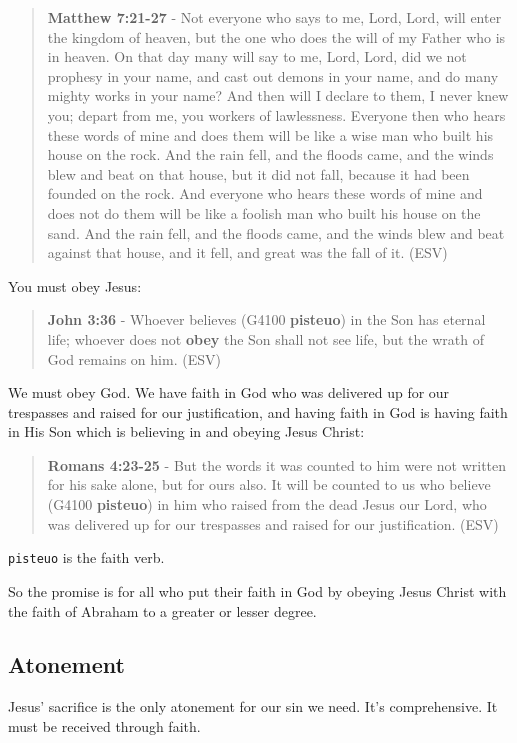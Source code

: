 \documentclass[11pt]{article}
\begin{document}
\begin{quote}
\textbf{Matthew 7:21-27} - Not everyone who says to me, Lord, Lord, will enter the kingdom of heaven, but the one who does the will of my Father who is in heaven.  On that day many will say to me, Lord, Lord, did we not prophesy in your name, and cast out demons in your name, and do many mighty works in your name?  And then will I declare to them, I never knew you; depart from me, you workers of lawlessness.  Everyone then who hears these words of mine and does them will be like a wise man who built his house on the rock.  And the rain fell, and the floods came, and the winds blew and beat on that house, but it did not fall, because it had been founded on the rock.  And everyone who hears these words of mine and does not do them will be like a foolish man who built his house on the sand.  And the rain fell, and the floods came, and the winds blew and beat against that house, and it fell, and great was the fall of it. (ESV)
\end{quote}

You must obey Jesus:

\begin{quote}
\textbf{John 3:36} - Whoever believes (G4100 \textbf{pisteuo}) in the Son has eternal life; whoever does not \textbf{obey} the Son shall not see life, but the wrath of God remains on him. (ESV)
\end{quote}

We must obey God. We have faith in God who was delivered up for our trespasses and raised for our justification, and having faith in God is having faith in His Son which is believing in and obeying Jesus Christ:

\begin{quote}
\textbf{Romans 4:23-25} - But the words it was counted to him were not written for his sake alone, but for ours also. It will be counted to us who believe (G4100 \textbf{pisteuo}) in him who raised from the dead Jesus our Lord, who was delivered up for our trespasses and raised for our justification. (ESV)
\end{quote}

\texttt{pisteuo} is the faith verb.

So the promise is for all who put their faith in God by obeying Jesus Christ with the faith of Abraham to a greater or lesser degree.

\subsection{Atonement}
\label{sec:org75a6856}
Jesus' sacrifice is the only atonement for our sin we need. It's comprehensive.
It must be received through faith.
\end{document}
